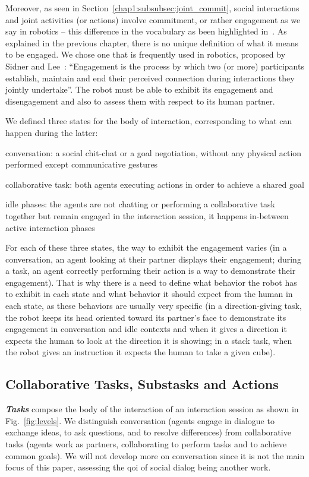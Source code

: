 \documentclass[a4paper,11pt,twoside]{StyleThese}
\begin{document}
Moreover, as seen in Section~\ref{chap1:subsubsec:joint_commit}, social interactions and joint activities (or actions) involve commitment, or rather engagement as we say in robotics -- this difference in the vocabulary as been highlighted in~\cite{castro_2019_commitments}. As explained in the previous chapter, there is no unique definition of what it means to be engaged. We chose one that is frequently used in robotics, proposed by Sidner and Lee~\cite{sidner_2003_engagement}: ``Engagement is the process by which two (or more) participants establish, maintain and end their perceived connection during interactions they jointly undertake''. The robot must be able to exhibit its engagement and disengagement and also to assess them with respect to its human partner.

We defined three states for the body of interaction, corresponding to what can happen during the latter: 
\begin{bulletList}
	\item conversation: a social chit-chat or a goal negotiation, without any physical action performed except communicative gestures
	\item collaborative task: both agents executing actions in order to achieve a shared goal
	\item idle phases: the agents are not chatting or performing a collaborative task together but remain engaged in the interaction session, it happens in-between active interaction phases
\end{bulletList}

For each of these three states, the way to exhibit the engagement varies (\eg in a conversation, an agent looking at their partner displays their engagement; during a task, an agent correctly performing their action is a way to demonstrate their engagement). That is why there is a need to define what behavior the robot has to exhibit in each state and what behavior it should expect from the human in each state, as these behaviors are usually very specific (\eg in a direction-giving task, the robot keeps its head oriented toward its partner's face to demonstrate its engagement in conversation and idle contexts and when it gives a direction it expects the human to look at the direction it is showing; in a stack task, when the robot gives an instruction it expects the human to take a given cube).


\subsection{Collaborative Tasks, Substasks and Actions}
\textbf{\textit{Tasks}} compose the body of the interaction of an interaction session as shown in Fig.~\ref{fig:levels}. We distinguish conversation (\ie agents engage in dialogue to exchange ideas, to ask questions, and to resolve differences) from collaborative tasks (\ie agents work as partners, collaborating to perform tasks and to achieve common goals). We will not develop more on conversation since it is not the main focus of this paper, assessing the \acrshort{qoi} of social dialog being another work.
\end{document}
